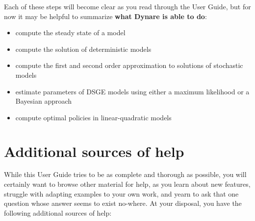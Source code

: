 Each of these steps will become clear as you read through the User Guide, but for now it may be helpful to summarize \textbf{what Dynare is able to do}:
\begin{itemize}
\item compute the steady state of a model
\item compute the solution of deterministic models
\item compute the first and second order approximation to solutions of stochastic models
\item estimate parameters of DSGE models using either a maximum likelihood or a Bayesian approach
\item compute optimal policies in linear-quadratic models
\end{itemize}


\section{Additional sources of help}
While this User Guide tries to be as complete and thorough as possible, you will certainly want to browse other material for help, as you learn about new features, struggle with adapting examples to your own work, and yearn to ask that one question whose answer seems to exist no-where. At your disposal, you have the following additional sources of help:
